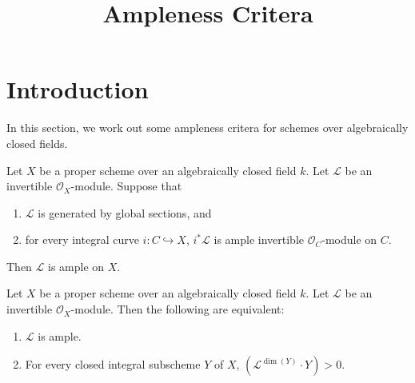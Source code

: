 

\title{Ampleness Critera}
\maketitle

\section{Introduction}
In this section, we work out some ampleness critera for schemes over
algebraically closed fields.

\begin{lemma}
\label{lemma-ample-on-curves}
Let $X$ be a proper scheme over an algebraically closed field $k$.
Let $\mathcal{L}$ be an invertible $\mathcal{O}_X$-module.
Suppose that
\begin{enumerate}
  \item $\mathcal{L}$ is generated by global sections, and
  \item for every integral curve $i : C \hookrightarrow X$, $i^*\mathcal{L}$
    is ample invertible $\mathcal{O}_C$-module on $C$.
\end{enumerate}
Then $\mathcal{L}$ is ample on $X$.
\end{lemma}

\begin{theorem}
\label{theorem-nakai-moishezon}
Let $X$ be a proper scheme over an algebraically closed field $k$.
Let $\mathcal{L}$ be an invertible $\mathcal{O}_X$-module.
Then the following are equivalent:
\begin{enumerate}
  \item $\mathcal{L}$ is ample.
  \item For every closed integral subscheme $Y$ of $X$,
    $(\mathcal{L}^{\dim(Y)} \cdot Y) > 0$.
\end{enumerate}
\end{theorem}




